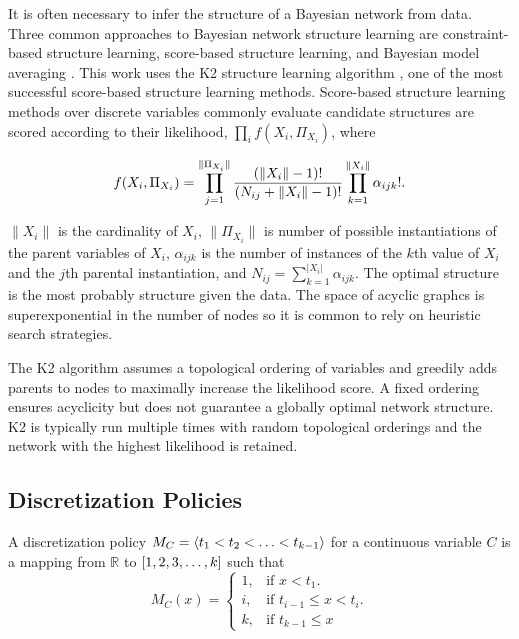 It is often necessary to infer the structure of a Bayesian network from data.
Three common approaches to Bayesian network structure learning are constraint-based structure learning, score-based structure learning, and Bayesian model averaging \citep[see][chap.~18]{PGM_2009}. This work uses the K2 structure learning algorithm \citep{K2}, one of the most successful score-based structure learning methods.
Score-based structure learning methods over discrete variables commonly evaluate candidate structures are scored according to their likelihood, $\prod_i f(X_i, \Pi_{X_i})$, where

\begin{align}
f(X_i, \Pi_{X_i}) = \prod_{j=1}^{\|\Pi_{X_i}\|} {{(\|X_i\|-1)!}\over{(N_{ij} + \|X_i\|-1)!}} \prod_{k=1}^{\|X_i\|} \alpha_{ijk}!\text{.}
\end{align}

\noindent
$\|X_i\|$ is the cardinality of $X_i$, $\|\Pi_{X_i}\|$ is number of possible instantiations of the parent variables of $X_i$, $\alpha_{ijk}$ is the number of instances of the $k$th value of $X_i$ and the $j$th parental instantiation, and $N_{ij} = \sum_{k=1}^{|X_i|} \alpha_{ijk}$.
The optimal structure is the most probably structure given the data.
The space of acyclic graphcs is superexponential in the number of nodes \citep{PGM_2009} so it is common to rely on heuristic search strategies.

The K2 algorithm assumes a topological ordering of variables and greedily adds parents to nodes to maximally increase the likelihood score.
A fixed ordering ensures acyclicity but does not guarantee a globally optimal network structure.
K2 is typically run multiple times with random topological orderings and the network with the highest likelihood is retained.

\subsection{Discretization Policies}

A discretization policy $M_C = \langle t_1 < t_2 < \ldots < t_{k-1} \rangle$ for a continuous variable $C$ is a mapping from $\mathbb{R}$ to $\brock{1,2,3,\ldots,k}$ such that
\begin{equation}
  M_C (x)=\begin{cases}
    1, & \text{if $x<t_1$}.\\
    i, & \text{if $t_{i-1} \leq x < t_i$}\text{.}\\
    k, & \text{if $t_{k-1} \leq x$}
  \end{cases}
\end{equation}

